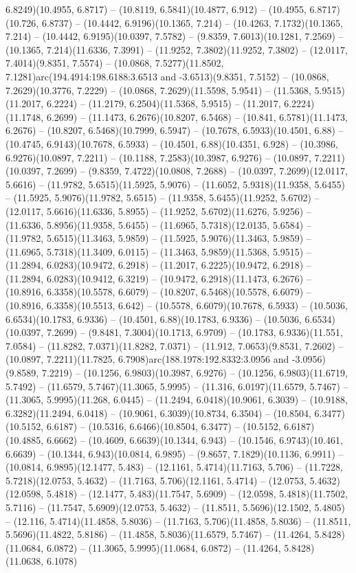 6.8249)(10.4955, 6.8717) -- (10.8119, 6.5841)(10.4877, 6.912) -- (10.4955, 6.8717)(10.726, 6.8737) -- (10.4442, 6.9196)(10.1365, 7.214) -- (10.4263, 7.1732)(10.1365, 7.214) -- (10.4442, 6.9195)(10.0397, 7.5782) -- (9.8359, 7.6013)(10.1281, 7.2569) -- (10.1365, 7.214)(11.6336, 7.3991) -- (11.9252, 7.3802)(11.9252, 7.3802) -- (12.0117, 7.4014)(9.8351, 7.5574) -- (10.0868, 7.5277)(11.8502, 7.1281)arc(194.4914:198.6188:3.6513 and -3.6513)(9.8351, 7.5152) -- (10.0868, 7.2629)(10.3776, 7.2229) -- (10.0868, 7.2629)(11.5598, 5.9541) -- (11.5368, 5.9515)(11.2017, 6.2224) -- (11.2179, 6.2504)(11.5368, 5.9515) -- (11.2017, 6.2224)(11.1748, 6.2699) -- (11.1473, 6.2676)(10.8207, 6.5468) -- (10.841, 6.5781)(11.1473, 6.2676) -- (10.8207, 6.5468)(10.7999, 6.5947) -- (10.7678, 6.5933)(10.4501, 6.88) -- (10.4745, 6.9143)(10.7678, 6.5933) -- (10.4501, 6.88)(10.4351, 6.928) -- (10.3986, 6.9276)(10.0897, 7.2211) -- (10.1188, 7.2583)(10.3987, 6.9276) -- (10.0897, 7.2211)(10.0397, 7.2699) -- (9.8359, 7.4722)(10.0808, 7.2688) -- (10.0397, 7.2699)(12.0117, 5.6616) -- (11.9782, 5.6515)(11.5925, 5.9076) -- (11.6052, 5.9318)(11.9358, 5.6455) -- (11.5925, 5.9076)(11.9782, 5.6515) -- (11.9358, 5.6455)(11.9252, 5.6702) -- (12.0117, 5.6616)(11.6336, 5.8955) -- (11.9252, 5.6702)(11.6276, 5.9256) -- (11.6336, 5.8956)(11.9358, 5.6455) -- (11.6965, 5.7318)(12.0135, 5.6584) -- (11.9782, 5.6515)(11.3463, 5.9859) -- (11.5925, 5.9076)(11.3463, 5.9859) -- (11.6965, 5.7318)(11.3409, 6.0115) -- (11.3463, 5.9859)(11.5368, 5.9515) -- (11.2894, 6.0283)(10.9472, 6.2918) -- (11.2017, 6.2225)(10.9472, 6.2918) -- (11.2894, 6.0283)(10.9412, 6.3219) -- (10.9472, 6.2918)(11.1473, 6.2676) -- (10.8916, 6.3358)(10.5578, 6.6079) -- (10.8207, 6.5468)(10.5578, 6.6079) -- (10.8916, 6.3358)(10.5513, 6.642) -- (10.5578, 6.6079)(10.7678, 6.5933) -- (10.5036, 6.6534)(10.1783, 6.9336) -- (10.4501, 6.88)(10.1783, 6.9336) -- (10.5036, 6.6534)(10.0397, 7.2699) -- (9.8481, 7.3004)(10.1713, 6.9709) -- (10.1783, 6.9336)(11.551, 7.0584) -- (11.8282, 7.0371)(11.8282, 7.0371) -- (11.912, 7.0653)(9.8531, 7.2602) -- (10.0897, 7.2211)(11.7825, 6.7908)arc(188.1978:192.8332:3.0956 and -3.0956)(9.8589, 7.2219) -- (10.1256, 6.9803)(10.3987, 6.9276) -- (10.1256, 6.9803)(11.6719, 5.7492) -- (11.6579, 5.7467)(11.3065, 5.9995) -- (11.316, 6.0197)(11.6579, 5.7467) -- (11.3065, 5.9995)(11.268, 6.0445) -- (11.2494, 6.0418)(10.9061, 6.3039) -- (10.9188, 6.3282)(11.2494, 6.0418) -- (10.9061, 6.3039)(10.8734, 6.3504) -- (10.8504, 6.3477)(10.5152, 6.6187) -- (10.5316, 6.6466)(10.8504, 6.3477) -- (10.5152, 6.6187)(10.4885, 6.6662) -- (10.4609, 6.6639)(10.1344, 6.943) -- (10.1546, 6.9743)(10.461, 6.6639) -- (10.1344, 6.943)(10.0814, 6.9895) -- (9.8657, 7.1829)(10.1136, 6.9911) -- (10.0814, 6.9895)(12.1477, 5.483) -- (12.1161, 5.4714)(11.7163, 5.706) -- (11.7228, 5.7218)(12.0753, 5.4632) -- (11.7163, 5.706)(12.1161, 5.4714) -- (12.0753, 5.4632)(12.0598, 5.4818) -- (12.1477, 5.483)(11.7547, 5.6909) -- (12.0598, 5.4818)(11.7502, 5.7116) -- (11.7547, 5.6909)(12.0753, 5.4632) -- (11.8511, 5.5696)(12.1502, 5.4805) -- (12.116, 5.4714)(11.4858, 5.8036) -- (11.7163, 5.706)(11.4858, 5.8036) -- (11.8511, 5.5696)(11.4822, 5.8186) -- (11.4858, 5.8036)(11.6579, 5.7467) -- (11.4264, 5.8428)(11.0684, 6.0872) -- (11.3065, 5.9995)(11.0684, 6.0872) -- (11.4264, 5.8428)(11.0638, 6.1078) 